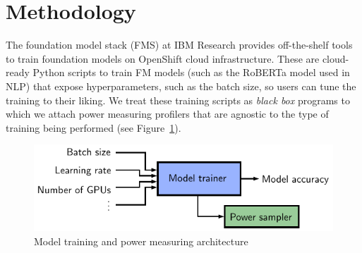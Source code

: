 \documentclass{article}
\begin{document}
    \section{Methodology}
    {
        The foundation model stack (FMS) at IBM Research provides off-the-shelf tools to train foundation models on OpenShift cloud infrastructure. These are cloud-ready Python scripts to train FM models (such as the RoBERTa model used in NLP) that expose hyperparameters, such as the batch size, so users can tune the training to their liking. We treat these training scripts as \textit{black box} programs to which we attach power measuring profilers that are agnostic to the type of training being performed (see Figure~\ref{fig:architecture}).

        \begin{figure}[!h]
            \centering
            \includegraphics[width = 0.5 \textwidth]{../Figures/architecture.pdf}
            \caption{Model training and power measuring architecture}
            \label{fig:architecture}
        \end{figure}
    }
\end{document}
